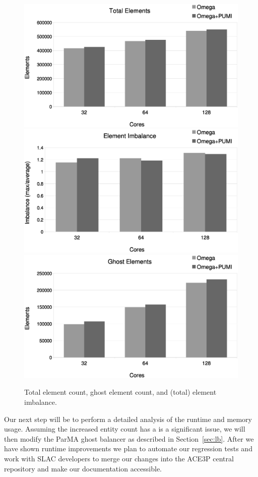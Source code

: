 \documentclass[a4paper]{article}
\begin{document}
\begin{figure}[ht]
\centering
  \includegraphics[width=\textwidth]{total-elms.eps} \\
  \includegraphics[width=\textwidth]{elm-imb.eps} \\
  \includegraphics[width=\textwidth]{ghost-elms.eps}
  \caption{\label{fig:elm} Total element count, ghost element count, and (total) element imbalance.}
\end{figure}

Our next step will be to perform a detailed analysis of the runtime and memory
usage.
Assuming the increased entity count has a is a significant issue, we will then modify
the ParMA ghost balancer as described in Section~\ref{sec:lb}.
After we have shown runtime improvements we plan to automate our regression
tests and work with SLAC developers to merge our changes into
the ACE3P central repository and make our documentation accessible.

\newpage 

\end{document}

